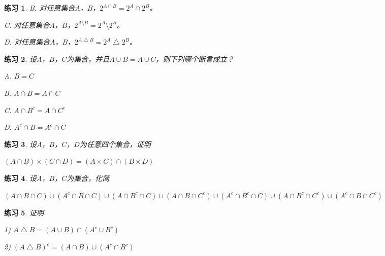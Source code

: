 \documentclass{book}[oneside]
\newtheorem{Exercise}{练习}[chapter]
\begin{document}
\begin{CJK*}{UTF8}{gbsn}
\begin{Exercise}
B. 对任意集合$A$，$B$，$2^{A\cap B} = 2^A \cap 2^B$。

C. 对任意集合$A$，$B$，$2^{A\setminus B} = 2^A \setminus 2^B$。

D. 对任意集合$A$，$B$，$2^{A\bigtriangleup B} = 2^A \bigtriangleup 2^B$。
  \end{Exercise}
  \begin{Exercise}
    设$A$，$B$，$C$为集合，并且$A\cup B = A \cup C$，则下列哪个断言成立？

    A. $B = C$

    B. $A \cap B = A \cap C$

    C. $A \cap B^c = A \cap C^c$

    D. $A^c \cap B = A^c \cap C$
  \end{Exercise}
  \begin{Exercise}
    设$A$，$B$，$C$，$D$为任意四个集合，证明

    $(A \cap B) \times (C \cap D) =
    (A\times C) \cap (B \times D)$
  \end{Exercise}
  \begin{Exercise}
   设$A$，$B$，$C$为集合，化简

$(A \cap B \cap C)\cup (A^c \cap B \cap C) \cup (A \cap B^c \cap C) \cup (A \cap B \cap C^c) \cup (A^c \cap B^c \cap C) \cup (A \cap B^c \cap C^c) \cup (A^c \cap B \cap C^c)$
  \end{Exercise}
  \begin{Exercise}
   证明

1) $A\bigtriangleup B = (A\cup B) \cap (A^c \cup B^c)$

2) $(A \bigtriangleup B)^c = (A \cap B) \cup (A^c \cap B^c)$


\end{Exercise}
\end{CJK*}
\end{document}
